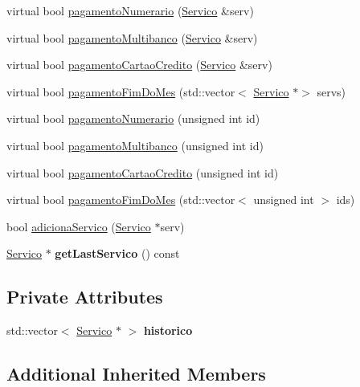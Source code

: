 \begin{DoxyCompactItemize}
virtual bool \hyperlink{class_registado_af3c8f63f7df1cdfd27e44126f78b71d8}{pagamento\+Numerario} (\hyperlink{class_servico}{Servico} \&serv)
\item 
virtual bool \hyperlink{class_registado_a36be4ccf8e4b1bc26be7c1c2d4612229}{pagamento\+Multibanco} (\hyperlink{class_servico}{Servico} \&serv)
\item 
virtual bool \hyperlink{class_registado_a1d6da4b2cbc8340fa79055a026d4ea44}{pagamento\+Cartao\+Credito} (\hyperlink{class_servico}{Servico} \&serv)
\item 
virtual bool \hyperlink{class_registado_a87218f9b1e1aa767c6c77b71f38cca55}{pagamento\+Fim\+Do\+Mes} (std\+::vector$<$ \hyperlink{class_servico}{Servico} $\ast$$>$ servs)
\item 
virtual bool \hyperlink{class_registado_a16a6ec63ed53fd4b6ebb1105ae5812d7}{pagamento\+Numerario} (unsigned int id)
\item 
virtual bool \hyperlink{class_registado_a3338ad6a9c5980671f2eb3b48d8798de}{pagamento\+Multibanco} (unsigned int id)
\item 
virtual bool \hyperlink{class_registado_a957b62d73c6ea619fb29e63255e11b12}{pagamento\+Cartao\+Credito} (unsigned int id)
\item 
virtual bool \hyperlink{class_registado_a0ee7364d85601f95bfe6bf45c062ec06}{pagamento\+Fim\+Do\+Mes} (std\+::vector$<$ unsigned int $>$ ids)
\item 
bool \hyperlink{class_registado_acc2088074502804017ff3e40022d966c}{adiciona\+Servico} (\hyperlink{class_servico}{Servico} $\ast$serv)
\item 
\mbox{\label{class_registado_a341dbb978550cb44c5d3d99107898a9a}} 
\hyperlink{class_servico}{Servico} $\ast$ {\bfseries get\+Last\+Servico} () const
\end{DoxyCompactItemize}
\subsection*{Private Attributes}
\begin{DoxyCompactItemize}
\item 
\mbox{\label{class_registado_ab5a4890cf0db0c42da0caeecb6f9f31f}} 
std\+::vector$<$ \hyperlink{class_servico}{Servico} $\ast$ $>$ {\bfseries historico}
\end{DoxyCompactItemize}
\subsection*{Additional Inherited Members}


